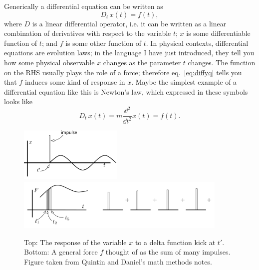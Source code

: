 Generically a differential equation can be written as
\begin{equation}\label{eq:diffyq}
  D_t\,x(t) = f(t),
\end{equation}
where $D$ is a linear differential operator, i.e. it can be written as
a linear combination of derivatives with respect to the variable $t$;
$x$ is some differentiable function of $t$; and $f$ is some other
function of $t$. In physical contexts, differential equations are
evolution laws; in the language I have just introduced, they tell you
how some physical observable $x$ changes as the parameter $t$ changes.
The function on the RHS usually plays the role of a force; therefore
eq.~\eqref{eq:diffyq} tells you that $f$ induces some kind of response in 
$x$. Maybe the simplest example of a differential equation like this
is Newton's law, which expressed in these symbols looks like
\begin{equation}
  D_t\,x(t)=m\frac{\dd^2}{\dd t^2}x(t) = f(t).
\end{equation}

\begin{figure}\label{fig:impulse}
\centering
\includegraphics[width=0.44\textwidth]{figs/impulse.png}\\
\includegraphics[width=0.90\textwidth]{figs/manyimpulses.png}
\caption{Top: The response of the variable $x$ to a delta function kick at 
$t'$. Bottom: A general force $f$ thought of as the sum of many impulses.
Figure taken from Quintin and Daniel's math methods notes.}
\end{figure}

